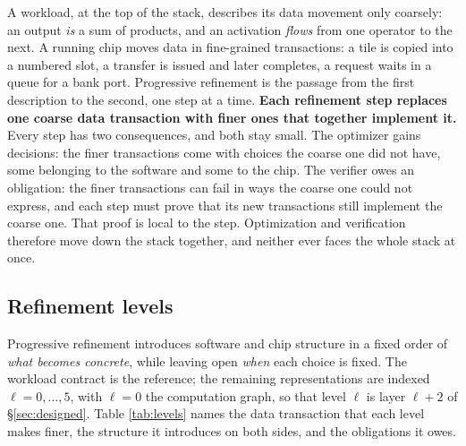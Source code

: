 \documentclass[11pt]{article}
\begin{document}
A workload, at the top of the stack, describes its data movement only coarsely: an output \emph{is} a sum of products, and an activation \emph{flows} from one operator to the next. A running chip moves data in fine-grained transactions: a tile is copied into a numbered slot, a transfer is issued and later completes, a request waits in a queue for a bank port. Progressive refinement is the passage from the first description to the second, one step at a time. \textbf{Each refinement step replaces one coarse data transaction with finer ones that together implement it.} Every step has two consequences, and both stay small. The optimizer gains decisions: the finer transactions come with choices the coarse one did not have, some belonging to the software and some to the chip. The verifier owes an obligation: the finer transactions can fail in ways the coarse one could not express, and each step must prove that its new transactions still implement the coarse one. That proof is local to the step. Optimization and verification therefore move down the stack together, and neither ever faces the whole stack at once.

\subsection{Refinement levels}\label{sec:levels}

Progressive refinement introduces software and chip structure in a fixed order of \emph{what becomes concrete}, while leaving open \emph{when} each choice is fixed. The workload contract is the reference; the remaining representations are indexed \(\ell=0,\dots,5\), with \(\ell=0\) the computation graph, so that level \(\ell\) is layer \(\ell+2\) of §\ref{sec:designed}. Table \ref{tab:levels} names the data transaction that each level makes finer, the structure it introduces on both sides, and the obligations it owes.
\end{document}
